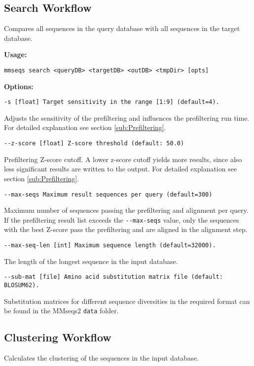 \documentclass[11pt,a4paper]{scrreprt}
\begin{document}
\subsection{Search Workflow} \label{sub:Search-workflow}
Compares all sequences in the query database with all sequences in
the target database. 

\textbf{Usage:}

\texttt{mmseqs search <queryDB> <targetDB> <outDB> <tmpDir> {[}opts{]}}

\textbf{Options:}

\texttt{\small -s {[}float{]} Target sensitivity in the range {[}1:9{]} (default=4).}{\small \par}

Adjusts the sensitivity of the prefiltering and influences the prefiltering run time. For detailed explanation see section \ref{sub:Prefiltering}.

\texttt{\small -{}-z-score {[}float{]} Z-score threshold (default: 50.0)}{\small \par}

Prefiltering Z-score cutoff. A lower z-score cutoff yields more results, since also less significant results are written to the output. For detailed explanation see section \ref{sub:Prefiltering}.

\texttt{\small -{}-max-seqs Maximum result sequences per query (default=300)}{\small \par}

Maximum number of sequences passing the prefiltering and alignment per query. If the prefiltering result list exceeds the \texttt{-{}-max-seqs} value, only the sequences with the best Z-score pass the prefiltering and are aligned in the alignment step.

\texttt{\small -{}-max-seq-len {[}int{]} Maximum sequence length (default=32000).}{\small \par}

The length of the longest sequence in the input database.

\texttt{\small -{}-sub-mat {[}file{]} Amino acid substitution matrix file (default: BLOSUM62).}{\small \par}

Substitution matrices for different sequence diversities in the required format can be found in the MMseqs2 \texttt{data} folder.
\subsection{Clustering Workflow} \label{sub:Clustering-workflow}
Calculates the clustering of the sequences in the input database. 
\end{document}
